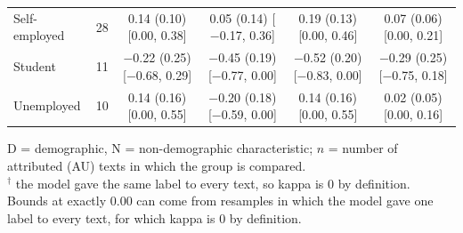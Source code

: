 \begin{table}[t]
\begin{tabular}{@{}lr*{4}{c}@{}}
\quad Self-employed & 28 & \makecell{0.14 (0.10)\\ {[}0.00, 0.38{]}} & \makecell{0.05 (0.14)\\ {[}$-$0.17, 0.36{]}} & \makecell{0.19 (0.13)\\ {[}0.00, 0.46{]}} & \makecell{0.07 (0.06)\\ {[}0.00, 0.21{]}} \\
\quad Student & 11 & \makecell{$-$0.22 (0.25)\\ {[}$-$0.68, 0.29{]}} & \makecell{$-$0.45 (0.19)\\ {[}$-$0.77, 0.00{]}} & \makecell{$-$0.52 (0.20)\\ {[}$-$0.83, 0.00{]}} & \makecell{$-$0.29 (0.25)\\ {[}$-$0.75, 0.18{]}} \\
\quad Unemployed & 10 & \makecell{0.14 (0.16)\\ {[}0.00, 0.55{]}} & \makecell{$-$0.20 (0.18)\\ {[}$-$0.59, 0.00{]}} & \makecell{0.14 (0.16)\\ {[}0.00, 0.55{]}} & \makecell{0.02 (0.05)\\ {[}0.00, 0.16{]}} \\
\bottomrule
\end{tabular}
\par\smallskip
\begin{minipage}{\linewidth}
\footnotesize
D = demographic, N = non-demographic characteristic; $n$ = number of attributed (\ac{AU}) texts in which the group is compared. \\
$^\dagger$ the model gave the same label to every text, so kappa is 0 by definition. \\
Bounds at exactly 0.00 can come from resamples in which the model gave one label to every text, for which kappa is 0 by definition.
\end{minipage}
\end{table}
